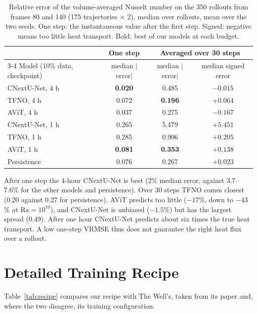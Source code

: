 \documentclass[11pt]{article}
\begin{document}
\begin{table}[!htbp]
\centering\small
\begin{tabular}{@{}lccc@{}}
\toprule
& One step & \multicolumn{2}{c}{Averaged over 30 steps} \\
\cmidrule(l){3-4}
Model (10\% data, checkpoint) & median $|$error$|$ & median $|$error$|$ & median signed error \\
\midrule
CNextU-Net, 4 h & \textbf{0.020} & 0.485 & $-0.015$ \\
TFNO, 4 h & 0.072 & \textbf{0.196} & $+0.064$ \\
AViT, 4 h & 0.037 & 0.275 & $-0.167$ \\
\midrule
CNextU-Net, 1 h & 0.265 & 5.479 & $+5.451$ \\
TFNO, 1 h & 0.285 & 0.906 & $+0.205$ \\
AViT, 1 h & \textbf{0.081} & \textbf{0.353} & $+0.138$ \\
\midrule
Persistence & 0.076 & 0.267 & $+0.023$ \\
\bottomrule
\end{tabular}
\caption{Relative error of the volume-averaged Nusselt number on the 350 rollouts from frames 80 and 140 (175
trajectories $\times$ 2), median over rollouts, mean over the two seeds. One step: the instantaneous value after
the first step. Signed: negative means too little heat transport. Bold: best of our models at each budget.}
\label{tab:nusselt}
\end{table}

After one step the 4-hour CNextU-Net is best (2\% median error, against 3.7--7.6\% for the other models and
persistence). Over 30 steps TFNO comes closest (0.20 against 0.27 for persistence), AViT predicts too little ($-17$\%,
down to $-43$\% at $\mathrm{Ra}=10^{10}$), and CNextU-Net is unbiased ($-1.5$\%) but has the largest spread (0.49).
After one hour CNextU-Net predicts about six times the true heat transport. A low
one-step VRMSE thus does not guarantee the right heat flux over a rollout.

\section{Detailed Training Recipe}
\label{app:recipe}

Table~\ref{tab:recipe} compares our recipe with The Well's, taken from its paper and, where the two disagree, its
training configuration.
\end{document}
